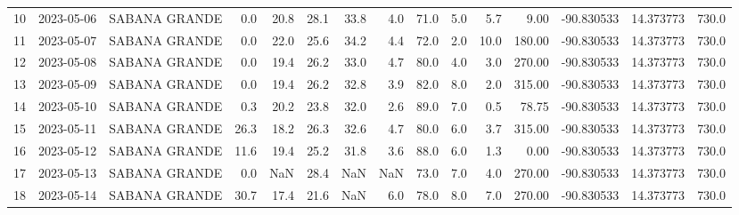 \documentclass[12pt]{article}
\begin{document}
\begin{center}
\begin{tabular}{lllrrrrrrrrrrrr}
10  & 2023-05-06 &  SABANA GRANDE &     0.0 &  20.8 &   28.1 &  33.8 &      4.0 &     71.0 &  5.0 &         5.7 &        9.00 & -90.830533 &  14.373773 &    730.0 \\
11  & 2023-05-07 &  SABANA GRANDE &     0.0 &  22.0 &   25.6 &  34.2 &      4.4 &     72.0 &  2.0 &        10.0 &      180.00 & -90.830533 &  14.373773 &    730.0 \\
12  & 2023-05-08 &  SABANA GRANDE &     0.0 &  19.4 &   26.2 &  33.0 &      4.7 &     80.0 &  4.0 &         3.0 &      270.00 & -90.830533 &  14.373773 &    730.0 \\
13  & 2023-05-09 &  SABANA GRANDE &     0.0 &  19.4 &   26.2 &  32.8 &      3.9 &     82.0 &  8.0 &         2.0 &      315.00 & -90.830533 &  14.373773 &    730.0 \\
14  & 2023-05-10 &  SABANA GRANDE &     0.3 &  20.2 &   23.8 &  32.0 &      2.6 &     89.0 &  7.0 &         0.5 &       78.75 & -90.830533 &  14.373773 &    730.0 \\
15  & 2023-05-11 &  SABANA GRANDE &    26.3 &  18.2 &   26.3 &  32.6 &      4.7 &     80.0 &  6.0 &         3.7 &      315.00 & -90.830533 &  14.373773 &    730.0 \\
16  & 2023-05-12 &  SABANA GRANDE &    11.6 &  19.4 &   25.2 &  31.8 &      3.6 &     88.0 &  6.0 &         1.3 &        0.00 & -90.830533 &  14.373773 &    730.0 \\
17  & 2023-05-13 &  SABANA GRANDE &     0.0 &   NaN &   28.4 &   NaN &      NaN &     73.0 &  7.0 &         4.0 &      270.00 & -90.830533 &  14.373773 &    730.0 \\
18  & 2023-05-14 &  SABANA GRANDE &    30.7 &  17.4 &   21.6 &   NaN &      6.0 &     78.0 &  8.0 &         7.0 &      270.00 & -90.830533 &  14.373773 &    730.0 \\
\bottomrule
\end{tabular}

        
        \end{center}
        
\end{document}
